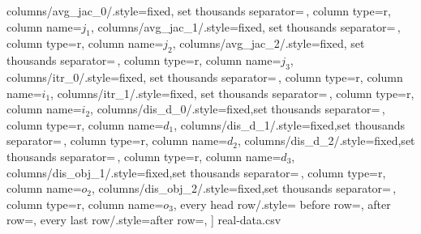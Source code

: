 \begin{table}[t!]
    columns/avg_jac_0/.style={fixed, set thousands separator={\,}, column type=r, column name=$j_{1}$}, 
    columns/avg_jac_1/.style={fixed, set thousands separator={\,}, column type=r, column name=$j_{2}$}, 
    columns/avg_jac_2/.style={fixed, set thousands separator={\,}, column type=r, column name=$j_{3}$}, 
    columns/itr_0/.style={fixed, set thousands separator={\,}, column type=r, column name=$i_1$},
    columns/itr_1/.style={fixed, set thousands separator={\,}, column type=r, column name=$i_2$},
    columns/dis_d_0/.style={fixed,set thousands separator={\,}, column type=r, column name=$d_1$},
    columns/dis_d_1/.style={fixed,set thousands separator={\,}, column type=r, column name=$d_2$},
    columns/dis_d_2/.style={fixed,set thousands separator={\,}, column type=r, column name=$d_3$},
    columns/dis_obj_1/.style={fixed,set thousands separator={\,}, column type=r, column name=$o_2$},
    columns/dis_obj_2/.style={fixed,set thousands separator={\,}, column type=r, column name=$o_3$},
    every head row/.style={
		before row={\toprule},
			after row=\midrule},
    every last row/.style={after row=\bottomrule},
]
{real-data.csv}
\end{table}


